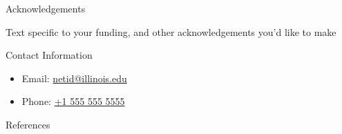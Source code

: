 \documentclass[final]{beamer}
\newlength{\onecolwid}
\newlength{\threecolwid}
\begin{document}
\begin{frame}[t]
\begin{columns}[t,totalwidth=\threecolwid]
\begin{column}{\onecolwid}
\begin{block}{Acknowledgements}
	
	Text specific to your funding, and other acknowledgements you'd like to make
	
\end{block}



\begin{alertblock}{Contact Information}
	\begin{itemize}
		\item Email: \href{mailto:netid@illinois.edu}{netid@illinois.edu}
		\item Phone: \href{tel:15555555555}{+1 555 555 5555}
	\end{itemize}
	
\end{alertblock}

\begin{block}{References}

	{\footnotesize 
	}
\end{block}





\end{column} %

\end{columns} %

\end{frame} %
\end{document}
